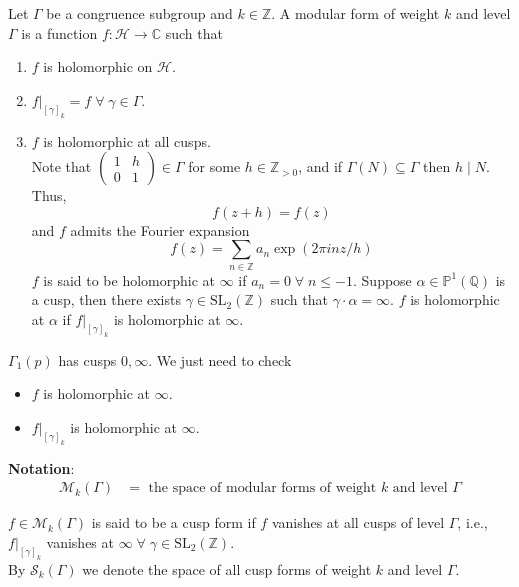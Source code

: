 \documentclass[oneside, 12pt]{scrbook}
\newcommand{\CC}{\mathbb C}
\newcommand{\QQ}{\mathbb Q}
\newcommand{\ZZ}{\mathbb Z}
\newcommand{\PP}{\mathbb{P}}
\newcommand{\SL}{\mathrm{SL}}
\newcommand{\Hh}{\mathcal{H}}
\newcommand{\Mm}{\mathcal{M}}
\newcommand{\Ss}{\mathcal{S}}
\theoremstyle{theorem}
\begin{document}
\begin{definition}
Let $\Gamma$ be a congruence subgroup and $k \in \ZZ$. A modular form of weight $k$ and level $\Gamma$ is a function $f: \Hh \rightarrow \CC$ such that 
\begin{enumerate}
\item $f$ is holomorphic on $\Hh$.
\item $f|_{[\gamma]_{k}} = f \; \forall \; \gamma \in \Gamma$.
\item $f$ is holomorphic at all cusps. \\
Note that $\begin{pmatrix}
1 & h \\ 0 & 1
\end{pmatrix} \in \Gamma$ for some $h \in \ZZ_{>0}$, and if $\Gamma(N) \subseteq \Gamma$ then $h \mid N$. Thus, $$f(z+h) = f(z)$$ and $f $ admits the Fourier expansion $$f(z) = \sum_{n \in \ZZ} a_{n} \exp(2 \pi i n z/h)$$
$f$ is said to be holomorphic at $\infty$ if $a_{n} =0 \; \forall \; n \le -1$. Suppose $\alpha \in \PP^1(\QQ)$ is a cusp, then there exists $\gamma \in \SL_{2}(\ZZ)$ such that $\gamma \cdot \alpha = \infty$. $f$ is holomorphic at $\alpha$ if $f|_{[\gamma]_{k}}$ is holomorphic at $\infty$.
\end{enumerate}
\end{definition}

\begin{example}
$\Gamma_{1}(p)$ has cusps $0, \infty$. We just need to check 
\begin{itemize}
\item $f$ is holomorphic at $\infty$.
\item $f|_{[\gamma]_{k}}$ is holomorphic at $\infty$.
\end{itemize}
\end{example}

\textbf{Notation}: 
\begin{align*}
\Mm_{k}(\Gamma) &= \text{ the space of modular forms of weight $k$ and level $\Gamma$} 
\end{align*}

\begin{definition}
$f \in \Mm_{k}(\Gamma)$ is said to be a cusp form if $f$ vanishes at all cusps of level $\Gamma$, i.e., $f|_{[\gamma]_{k}}$ vanishes at $\infty \; \forall \; \gamma \in \SL_{2}(\ZZ)$. \\

By $\Ss_{k}(\Gamma)$ we denote the space of all cusp forms of weight $k$ and level $\Gamma$.
\end{definition}
\end{document}
